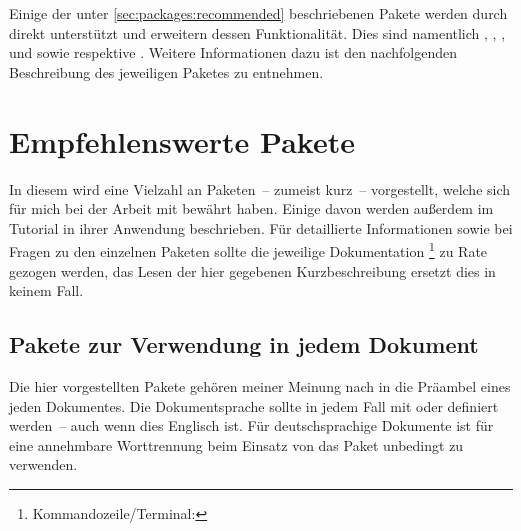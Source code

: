 
Einige der unter \autoref{sec:packages:recommended} beschriebenen Pakete werden 
durch \TUDScript direkt unterstützt und erweitern dessen Funktionalität. Dies
sind namentlich , , , 
 und  sowie  respektive 
. Weitere Informationen dazu ist den nachfolgenden 
Beschreibung des jeweiligen Paketes zu entnehmen.



\section{%
  Empfehlenswerte Pakete%
  \label{sec:packages:recommended}%
}

In diesem \autorefname wird eine Vielzahl an Paketen~-- zumeist kurz~-- 
vorgestellt, welche sich für mich bei der Arbeit mit  bewährt 
haben. Einige davon werden außerdem im Tutorial  in 
ihrer Anwendung beschrieben. Für detaillierte Informationen sowie bei Fragen zu 
den einzelnen Paketen sollte die jeweilige Dokumentation%
\footnote{Kommandozeile/Terminal: }
zu Rate gezogen werden, das Lesen der hier gegebenen Kurzbeschreibung ersetzt 
dies in keinem Fall.



\subsection{Pakete zur Verwendung in jedem Dokument}

Die hier vorgestellten Pakete gehören meiner Meinung nach in die Präambel eines 
jeden Dokumentes. Die Dokumentsprache sollte in jedem Fall mit  
oder  definiert werden~-- auch wenn dies Englisch ist. Für 
deutschsprachige Dokumente ist für eine annehmbare Worttrennung beim Einsatz 
von  das Paket  unbedingt zu verwenden.

